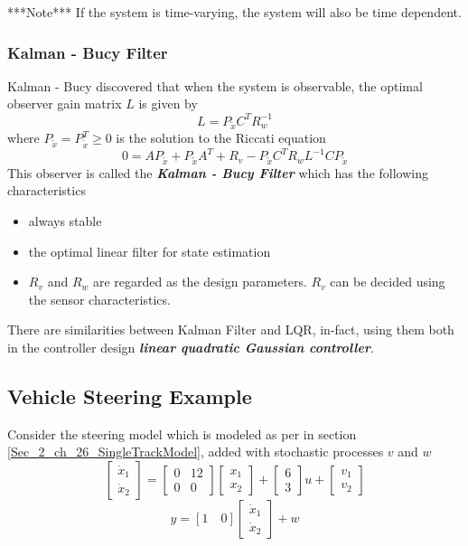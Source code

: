 ***Note*** If the system is time-varying, the system will also be time dependent.

\subsubsection{Kalman - Bucy Filter}

Kalman - Bucy discovered that when the system is observable, the optimal observer gain matrix $L$ is given by
\begin{equation}
	L = P_{\tilde{x}} C^{T} R_{w}^{-1}
\end{equation}
where $P_{\tilde{x}} = P^{T}_{\tilde{x}} \geq 0$ is the solution to the Riccati equation
\begin{equation}
	0 = A P_{\tilde{x}} + P_{\tilde{x}} A^{T} + R_{v} - P_{\tilde{x}}C^{T}R_{w}L^{-1}CP_{\tilde{x}}
\end{equation}
This observer is called the \textbf{\textit{Kalman - Bucy Filter}} which has the following characteristics
\begin{itemize}
	\item always stable
	\item the optimal linear filter for state estimation
	\item  $R_{v}$ and $R_{w}$ are regarded as the design parameters. $R_{v}$ can be decided using the sensor characteristics.
\end{itemize}
There are similarities between Kalman Filter and LQR, in-fact, using them both in the controller design \textbf{\textit{linear quadratic Gaussian controller}}.

\subsection{Vehicle Steering Example}

Consider the steering model which is modeled as per in section \ref{Sec_2_ch_26_SingleTrackModel}, added with stochastic processes $v$ and $w$
\begin{equation}
\begin{bmatrix}
\dot{x}_{1} \\ \dot{x}_{2}
\end{bmatrix} = \begin{bmatrix}
0 & 12 \\ 0 & 0
\end{bmatrix}\begin{bmatrix}
{x}_{1} \\ {x}_{2}
\end{bmatrix} + \begin{bmatrix}
6 \\ 3
\end{bmatrix}u + \begin{bmatrix}
v_{1} \\ v_{2}
\end{bmatrix}
\end{equation}
\begin{equation}
y = [1 \quad 0] \begin{bmatrix}
\dot{x}_{1} \\ \dot{x}_{2}
\end{bmatrix} + w
\end{equation}

